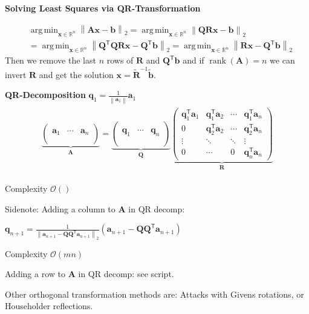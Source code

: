 \documentclass[a4paper,11pt]{extarticle}
\newcommand{\BigO}{\mathcal{O}}
\newcommand{\R}{\mathbb{R}}
\newcommand{\norm}[1]{\left\lVert #1 \right\rVert}
\newcommand*{\T}{\mathsf{T}}
\DeclareMathOperator{\rank}{rank}
\DeclareMathOperator*{\argmin}{arg\,min}
\newcommand{\mat}[1]{\mathbf{#1}}
\renewcommand{\vec}[1]{\mathbf{#1}}
\newcommand{\va}{\vec{a}}
\newcommand{\vb}{\vec{b}}
\newcommand{\vq}{\vec{q}}
\newcommand{\vx}{\vec{x}}
\newcommand{\vtb}{\widetilde{\vec{b}}}
\newcommand{\MA}{\mat{A}}
\newcommand{\MQ}{\mat{Q}}
\newcommand{\MR}{\mat{R}}
\newcommand{\MtR}{\widetilde{\mat{R}}}
\newcommand{\ssep}{\hdashrule[1.1ex]{\linewidth}{0.1pt}{0.3mm}}
\begin{document}
\begin{multicols*}{2}
\ssep

\textbf{Solving Least Squares via QR-Transformation}

\begin{align*}
&\argmin_{\vx\in\R^n}\norm{\MA\vx-\vb}_2
=\argmin_{\vx\in\R^n}\norm{\MQ\MR\vx-\vb}_2\\
&=\argmin_{\vx\in\R^n}\norm{\MQ^\T\MQ\MR\vx-\MQ^\T\vb}_2
=\argmin_{\vx\in\R^n}\norm{\MR\vx-\MQ^\T\vb}_2
\end{align*}
Then we remove the last $n$ rows of $\MR$ and $\MQ^\T\vb$ and if $\rank(\MA)=n$
we can invert $\MR$ and get the solution $\vx=\MtR^{-1}\vtb$.

\ssep

\textbf{QR-Decomposition} $\vq_1=\frac{1}{\norm{\va_1}}\va_1$
\begin{gather*}
\begin{align*}
\underbrace{
\begin{pmatrix}
\\
\va_1 & \cdots & \va_n\\
\\
\end{pmatrix}}_{\MA}
=
\underbrace{
\begin{pmatrix}
\\
\vq_1 & \cdots & \vq_n\\
\\
\end{pmatrix}}_{\MQ}
\underbrace{\begin{pmatrix}
\vq_1^\T\va_1 & \vq_1^\T\va_2 & \cdots & \vq_1^\T\va_n\\
0 & \vq_2^\T\va_2 & \cdots & \vq_2^\T\va_n\\
\vdots &\ddots &\ddots&\vdots\\
0 &\cdots &0&\vq_n^\T\va_n
\end{pmatrix}}_{\MR}
\end{align*}
\end{gather*}

Complexity $\BigO()$

\ssep

Sidenote: Adding a column to $\MA$ in QR decomp:

$\vq_{n+1}=\frac{1}{\norm{\va_{n+1}-\MQ\MQ^\T\va_{n+1}}_2}(\va_{n+1}-\MQ\MQ^\T\va_{n+1})$

Complexity $\BigO(mn)$

\ssep

Adding a row to $\MA$ in QR decomp: see script.

\ssep

Other orthogonal transformation methods are: Attacks with Givens rotations,
or Householder reflections.


\end{multicols*}
\end{document}
